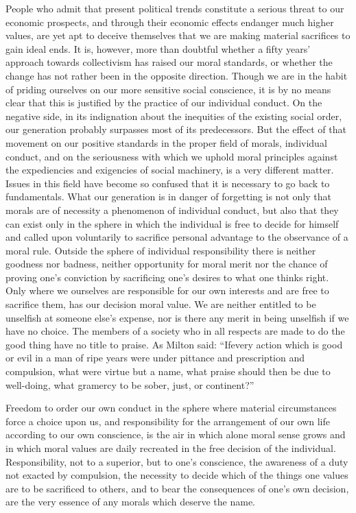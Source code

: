 \documentclass[11pt,openany]{book}
\begin{document}
People who admit that present political trends constitute a serious threat to our economic prospects, and through their economic effects endanger much higher values, are yet apt to deceive themselves that we are making material sacrifices to gain ideal ends. It is, however, more than doubtful whether a fifty years' approach towards collectivism has raised our moral standards, or whether the change has not rather been in the opposite direction. Though we are in the habit of priding ourselves on our more sensitive social conscience, it is by no means clear that this is justified by the practice of our individual conduct. On the negative side, in its indignation about the inequities of the existing social order, our generation probably surpasses most of its predecessors. But the effect of that movement on our positive standards in the proper field of morals, individual conduct, and on the seriousness with which we uphold moral principles against the expediencies and exigencies of social machinery, is a very different matter. Issues in this field have become so confused that it is necessary to go back to fundamentals. What our generation is in danger of forgetting is not only that morals are of necessity a phenomenon of individual conduct, but also that they can exist only in the sphere in which the individual is free to decide for himself and called upon voluntarily to sacrifice personal advantage to the observance of a moral rule. Outside the sphere of individual responsibility there is neither goodness nor badness, neither opportunity for moral merit nor the chance of proving one's conviction by sacrificing one's desires to what one thinks right. Only where we ourselves are responsible for our own interests and are free to sacrifice them, has our decision moral value. We are neither entitled to be unselfish at someone else's expense, nor is there any merit in being unselfish if we have no choice. The members of a society who in all respects are made to do the good thing have no title to praise. As Milton said: ``Ifevery action which is good or evil in a man of ripe years were under pittance and prescription and compulsion, what were virtue but a name, what praise should then be due to well-doing, what gramercy to be sober, just, or continent?''

Freedom to order our own conduct in the sphere where material circumstances force a choice upon us, and responsibility for the arrangement of our own life according to our own conscience, is the air in which alone moral sense grows and in which moral values are daily recreated in the free decision of the individual. Responsibility, not to a superior, but to one's conscience, the awareness of a duty not exacted by compulsion, the necessity to decide which of the things one values are to be sacrificed to others, and to bear the consequences of one's own decision, are the very essence of any morals which deserve the name.
\end{document}
